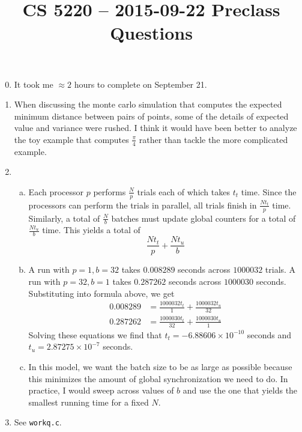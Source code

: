\documentclass{hw}
\title{CS 5220 -- 2015-09-22 Preclass Questions}
\begin{document}
\maketitle{}

\begin{enumerate}
  \setcounter{enumi}{-1}
  \item It took me $\approx 2$ hours to complete on September 21.

  \item
    When discussing the monte carlo simulation that computes the expected
    minimum distance between pairs of points, some of the details of expected
    value and variance were rushed. I think it would have been better to
    analyze the toy example that computes $\frac{\pi}{4}$ rather than tackle
    the more complicated example.

  \item
    \begin{enumerate}[a)]
      \item
        Each processor $p$ performs $\frac{N}{p}$ trials each of which takes
        $t_t$ time. Since the processors can perform the trials in parallel,
        all trials finish in $\frac{Nt_t}{p}$ time. Similarly, a total of
        $\frac{N}{b}$ batches must update global counters for a total of
        $\frac{N t_u}{b}$ time. This yields a total of
        \[
          \frac{N t_t}{p} + \frac{N t_u}{b}
        \]

      \item
        A run with $p = 1, b = 32$ takes $0.008289$ seconds across $1000032$
        trials. A run with $p = 32, b = 1$ takes $0.287262$ seconds across
        $1000030$ seconds. Substituting into formula above, we get
        \begin{align*}
          0.008289 &= \frac{1000032 t_t}{1} + \frac{1000032 t_u}{32} \\
          0.287262 &= \frac{1000030 t_t}{32} + \frac{1000030 t_u}{1}
        \end{align*}
        Solving these equations we find that $t_t = -6.88606 \times 10^{-10}$
        seconds and $t_u = 2.87275 \times 10^{-7}$ seconds.

      \item
        In this model, we want the batch size to be as large as possible
        because this minimizes the amount of global synchronization we need to
        do. In practice, I would sweep across values of $b$ and use the one
        that yields the smallest running time for a fixed $N$.
    \end{enumerate}

  \item
    See \texttt{workq.c}.
\end{enumerate}
\end{document}
